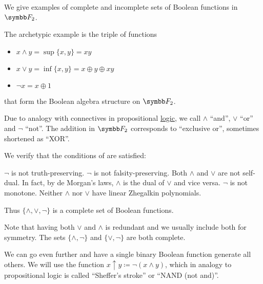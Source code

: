 \begin{Example}\label{ex:posts_completeness_theorem}
  We give examples of complete and incomplete sets of Boolean functions in \( \BF_2 \).

  \begin{ExEnum}
     The archetypic example is the triple of functions
    \begin{itemize}
     \item \( x \wedge y = \sup \{ x, y \} = xy \)
     \item \( x \vee y = \inf \{ x, y \} = x \oplus y \oplus xy \)
     \item \( \neg x = x \oplus 1 \)
    \end{itemize}
    that form the Boolean algebra structure on \( \BF_2 \).

    Due to analogy with connectives in propositional \hyperref[def:propositional_language]{logic}, we call \( \wedge \) \enquote{and}, \( \vee \) \enquote{or} and \( \neg \) \enquote{not}. The addition in \( \BF_2 \) corresponds to \enquote{exclusive or}, sometimes shortened as \enquote{XOR}.

    We verify that the conditions of  are satisfied:
    \begin{RefList}
       \( \neg \) is not truth-preserving.
       \( \neg \) is not falsity-preserving.
       Both \( \wedge \) and \( \vee \) are not self-dual. In fact, by de Morgan's laws, \( \wedge \) is the dual of \( \vee \) and vice versa.
       \( \neg \) is not monotone.
       Neither \( \wedge \) nor \( \vee \) have linear Zhegalkin polynomials.
    \end{RefList}

    Thus \( \{ \wedge, \vee, \neg \} \) is a complete set of Boolean functions.

    Note that having both \( \vee \) and \( \wedge \) is redundant and we usually include both for symmetry. The sets \( \{ \wedge, \neg \} \) and \( \{ \vee, \neg \} \) are both complete.

     We can go even further and have a single binary Boolean function generate all others. We will use the function \( x \uparrow y \coloneqq \neg(x \wedge y) \), which in analogy to propositional logic is called \enquote{Sheffer's stroke} or \enquote{NAND (not and)}.


\end{ExEnum}
\end{Example}
